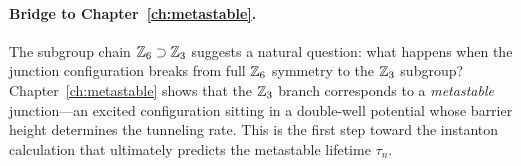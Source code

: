 \paragraph{Bridge to Chapter~\ref{ch:metastable}.}
The subgroup chain $\mathbb{Z}_6 \supset \mathbb{Z}_3$ suggests a natural question: what
happens when the junction configuration breaks from full $\mathbb{Z}_6$ symmetry to
the $\mathbb{Z}_3$ subgroup? Chapter~\ref{ch:metastable} shows that the $\mathbb{Z}_3$
branch corresponds to a \emph{metastable} junction---an excited configuration
sitting in a double-well potential whose barrier height determines the
tunneling rate. This is the first step toward the instanton calculation that
ultimately predicts the metastable lifetime $\tau_n$.

